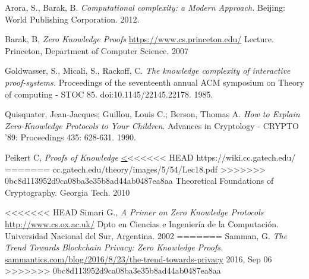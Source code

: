 \documentclass[oneside,10pt]{article}
\begin{document}
\begin{thebibliography}{99}

  Arora, S.,  Barak, B. 
  \emph{Computational complexity: a Modern Approach.}
  Beijing: World Publishing Corporation.
  2012.

  Barak, B,
  \emph{Zero Knowledge Proofs}
  \href{https://www.cs.princeton.edu/courses/archive/fall07/cos433/lec15.pdf}
       {https://www.cs.princeton.edu/}
       Lecture.
       Princeton, Department of Computer Science.
       2007

  Goldwasser, S., Micali, S.,  Rackoff, C.
  \emph{The knowledge complexity of interactive proof-systems.}
  Proceedings of the seventeenth annual ACM symposium on Theory of computing - STOC 85.
  doi:10.1145/22145.22178.
  1985.

  Quisquater, Jean-Jacques; Guillou, Louis C.; Berson, Thomas A.
  \emph{How to Explain Zero-Knowledge Protocols to Your Children}.
  Advances in Cryptology - CRYPTO '89:
  Proceedings 435: 628-631.
  1990.

  Peikert C,
  \emph{Proofs of Knowledge}
  \href{https://wiki.cc.gatech.edu/theory/images/5/54/Lec18.pdf}
<<<<<<< HEAD
  {https://wiki.cc.gatech.edu/}
=======
  {cc.gatech.edu/theory/images/5/54/Lec18.pdf}
>>>>>>> 0bc8d113952d9ca08ba3e35b8ad44ab0487ea8aa
  Theoretical Foundations of Cryptography.
  Georgia Tech.
  2010

<<<<<<< HEAD
  Simari G.,
  \emph{A Primer on Zero Knowledge Protocols}
  \href{http://www.cs.ox.ac.uk/people/gerardo.simari/personal/publications/zkp-simari2002.pdf}
       {http://www.cs.ox.ac.uk/}
       Dpto en Ciencias e Ingeniería de la Computación.
       Universidad Nacional del Sur, Argentina.
       2002
=======
  Samman, G.
  \emph{The Trend Towards Blockchain Privacy: Zero Knowledge Proofs.}
  \href{http://sammantics.com/blog/2016/8/23/the-trend-towards-privacy-how-blockchains-plan-to-accomplish-this}
  {sammantics.com/blog/2016/8/23/the-trend-towards-privacy}
  2016, Sep 06
>>>>>>> 0bc8d113952d9ca08ba3e35b8ad44ab0487ea8aa
\end{thebibliography}
\end{document}
